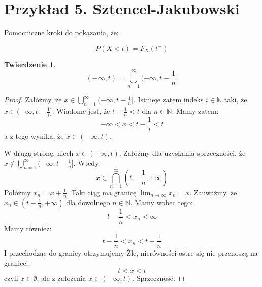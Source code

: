 \documentclass{article}
\newtheorem*{theorem}{Twierdzenie}
\begin{document}
\section{Przykład 5. Sztencel-Jakubowski}

Pomocniczne kroki do pokazania, że:

\begin{equation*}
    P(X < t) = F_{X}(t^{-})
\end{equation*}

\begin{theorem}
    \begin{equation*}
        (- \infty, t) = \bigcup_{n = 1}^{\infty}(- \infty, t - \frac{1}{n}]        
    \end{equation*}
\end{theorem}

\begin{proof}
    Załóżmy, że \(x \in \bigcup_{n = 1}^{\infty}(- \infty, t - \frac{1}{n}]\). Istnieje zatem indeks \(i \in \mathbb{N}\)
    taki, że \(x \in (- \infty, t - \frac{1}{i}]\). Wiadome jest, że \(t - \frac{1}{n} < t\) dla \(n \in \mathbb{N}\).
    Mamy zatem:
    \begin{equation*}
        - \infty < x < t - \frac{1}{i} < t
    \end{equation*}
    a z tego wynika, że \(x \in (- \infty, t)\).

    W drugą stronę, niech \(x \in (- \infty, t)\). Załóżmy dla uzyskania sprzeczności, że \(x \not\in \bigcup_{n = 1}^{\infty}(- \infty, t - \frac{1}{n}] \).
    Wtedy:
    \begin{equation*}
        x \in \bigcap_{n = 1}^{\infty}(t - \frac{1}{n}, + \infty)
    \end{equation*}
    Połóżmy \(x_n = x + \frac{1}{n} \). Taki ciąg ma granicę \(\lim_{n \to \infty} x_n = x\). Zauważmy, że \(x_n \in (t - \frac{1}{n}, + \infty)\) dla dowolnego \(n \in \mathbb{N}\).
    Mamy wobec tego:
    \begin{equation*}
        t - \frac{1}{n} < x_n < \infty
    \end{equation*}
    Mamy również:
    \begin{equation*}
        t - \frac{1}{n} < x_n <  t + \frac{1}{n}
    \end{equation*}
    \sout{I przechodząc do granicy otrzymujemy} Źle, nierówności ostre się nie przenoszą na granice!:
    \begin{equation*}
        t < x < t
    \end{equation*}
    czyli \(x \in \emptyset\), ale z założenia \(x \in (- \infty, t)\). Sprzeczność.
\end{proof}
\end{document}
